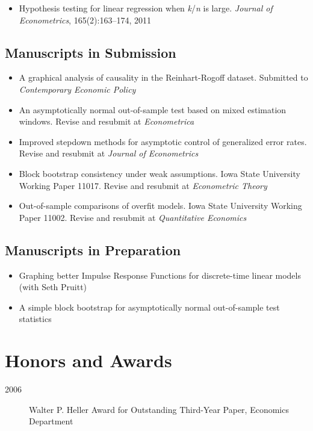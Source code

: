 \documentclass[12pt]{article}%
\newcommand{\allcaps}[1]{\textls{\MakeUppercase{#1}}}
\begin{document}
\begin{itemize}
\item Hypothesis testing for linear regression when
\textit{k}/\textit{n} is large. \textit{Journal of Econometrics},
165(2):163--174, 2011
\end{itemize}

\subsection*{Manuscripts in Submission}

\begin{itemize}
\item A graphical analysis of causality in the Reinhart-Rogoff
  dataset. Submitted to \textit{Contemporary Economic Policy}
\item An asymptotically normal out-of-sample test based on mixed
  estimation windows. Revise and resubmit at \textit{Econometrica}
\item Improved stepdown methods for asymptotic control of generalized
  error rates. Revise and resubmit at \textit{Journal of Econometrics}
\item Block bootstrap consistency under weak assumptions. Iowa State
  University Working Paper 11017. Revise and resubmit at
  \textit{Econometric Theory}
\item Out-of-sample comparisons of overfit models. Iowa State
  University Working Paper 11002. Revise and resubmit at
  \textit{Quantitative Economics}
\end{itemize}
  
\subsection*{Manuscripts in Preparation}
\begin{itemize}
\item Graphing better Impulse Response Functions for discrete-time
  linear models (with Seth Pruitt)
\item A simple block bootstrap for asymptotically normal out-of-sample
  test statistics
\end{itemize}

\section*{Honors and Awards}

\begin{description}
\item[2006] Walter P. Heller Award for Outstanding Third-Year Paper,
\allcaps{UCSD} Economics Department
\end{description}
\end{document}
